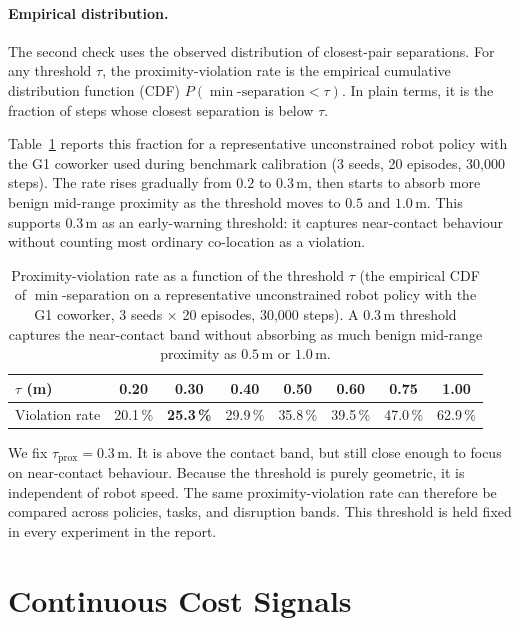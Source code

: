\documentclass[11pt,a4paper]{report}
\begin{document}
\paragraph{Empirical distribution.}
The second check uses the observed distribution of closest-pair
separations. For any threshold $\tau$, the proximity-violation rate is
the empirical cumulative distribution function (CDF)
$P(\min\text{-separation} < \tau)$. In plain terms, it is the fraction
of steps whose closest separation is below $\tau$.

Table~\ref{tab:prox-calib} reports this fraction for a representative
unconstrained robot policy with the G1 coworker used during benchmark calibration
(3 seeds, 20 episodes, 30{,}000 steps). The rate rises gradually from
$0.2$ to $0.3$\,m, then starts to absorb more benign mid-range
proximity as the threshold moves to $0.5$ and $1.0$\,m. This supports
$0.3$\,m as an early-warning threshold: it captures near-contact
behaviour without counting most ordinary co-location as a violation.

\begin{table}[htbp]
\centering
\small
\caption{Proximity-violation rate as a function of the threshold
$\tau$ (the empirical CDF of $\min$-separation on a representative
unconstrained robot policy with the G1 coworker, 3 seeds $\times$ 20 episodes,
30{,}000 steps). A $0.3$\,m threshold captures the near-contact band
without absorbing as much benign mid-range proximity as $0.5$\,m or
$1.0$\,m.}
\label{tab:prox-calib}
\begin{tabular}{lccccccc}
\toprule
$\tau$ (m) & 0.20 & \textbf{0.30} & 0.40 & 0.50 & 0.60 & 0.75 & 1.00 \\
\midrule
Violation rate & 20.1\,\% & \textbf{25.3\,\%} & 29.9\,\% & 35.8\,\% & 39.5\,\% & 47.0\,\% & 62.9\,\% \\
\bottomrule
\end{tabular}
\end{table}

We fix $\tau_{\mathrm{prox}} = 0.3$\,m. It is above the contact band,
but still close enough to focus on near-contact behaviour. Because the
threshold is purely geometric, it is independent of robot speed. The
same proximity-violation rate can therefore be compared across
policies, tasks, and disruption bands. This threshold is held fixed in
every experiment in the report.

\section{Continuous Cost Signals}
\label{sec:bench:cost}
\end{document}
